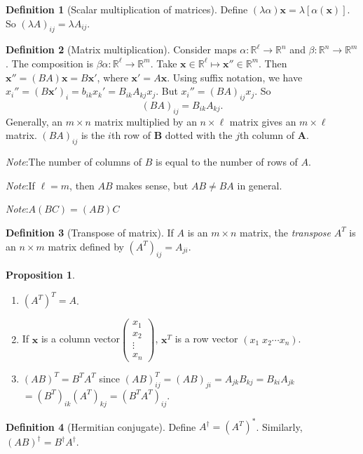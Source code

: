 \documentclass[a4paper]{article}
\theoremstyle{definition}
\newtheorem*{prop}{Proposition}
\newtheorem*{defi}{Definition}
\newcommand{\mb}[1]{\mathbf{#1}}
\newcommand{\note}{\noindent \emph{Note}:\;}
\newcommand{\R}{\mathbb{R}}
\begin{document}
\begin{defi}[Scalar multiplication of matrices]
  Define $(\lambda\alpha)\mb{x} = \lambda[\alpha(\mb{x})]$. So $(\lambda A)_{ij} = \lambda A_{ij}$.
\end{defi}

\begin{defi}[Matrix multiplication]
  Consider maps $\alpha: \R^\ell \to \R^n$  and $\beta: \R^n\to \R^m$. The composition is $\beta\alpha:\R^\ell\to\R^m$. Take $\mb{x}\in \R^\ell\mapsto \mb{x}''\in \R^m$. Then $\mb{x}'' = (BA)\mb{x} = B\mb{x'}$, where $\mb{x}' = A\mb{x}$. Using suffix notation, we have $x_i'' = (B\mb{x}')_i = b_{ik}x_k' = B_{ik}A_{kj}x_j$. But $x_i'' = (BA)_{ij}x_j$. So 
  \[
  (BA)_{ij} = B_{ik}A_{kj}.
  \]
  Generally, an $m\times n$ matrix multiplied by an $n\times \ell$ matrix gives an $m\times\ell$ matrix. $(BA)_{ij}$ is the $i$th row of $\mb{B}$ dotted with the $j$th column of $\mb{A}$.
\end{defi}
\note The number of columns of $B$ is equal to the number of rows of $A$.

\note If $\ell = m$, then $AB$ makes sense, but $AB\not= BA$ in general.

\note $A(BC) = (AB)C$

\begin{defi}[Transpose of matrix]
  If $A$ is an $m\times n$ matrix, the \emph{transpose} $A^T$ is an $n\times m$ matrix defined by $(A^T)_{ij} = A_{ji}$.
\end{defi}

\begin{prop}\leavevmode
  \begin{enumerate}
  \item $(A^T)^T = A$.
  \item If $\mb{x}$ is a column vector$\begin{pmatrix}x_1\\x_2\\\vdots\\x_n\end{pmatrix}$, $\mb{x}^T$ is a row vector $(x_1\; x_2\cdots x_n)$.
  \item $(AB)^T = B^TA^T$ since $(AB)^T_{ij} = (AB)_{ji} = A_{jk}B_{kj} = B_{ki}A_{jk} $\\$= (B^T)_{ik}(A^T)_{kj} = (B^TA^T)_{ij}$.
  \end{enumerate}
\end{prop}

\begin{defi}[Hermitian conjugate]
  Define $A^{\dagger} = (A^T)^*$. Similarly, $(AB)^\dagger = B^\dagger A^\dagger$.
\end{defi}
\end{document}
